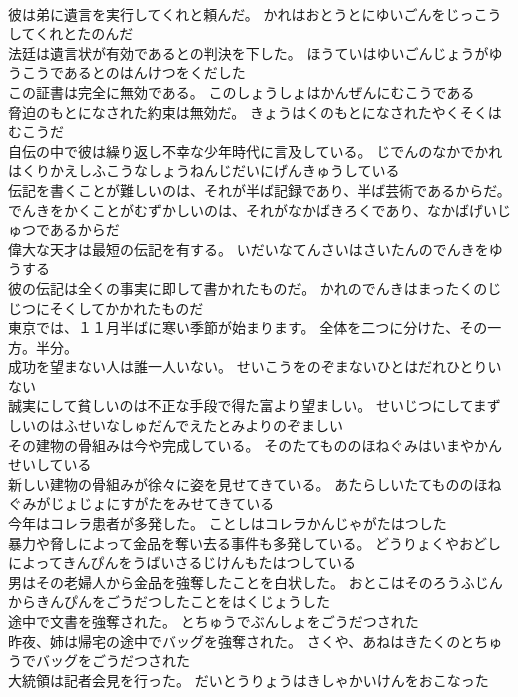 \documentclass[8pt]{extreport}
\begin{document}
\begin{CJK}{UTF8}{min}
\\	彼は弟に遺言を実行してくれと頼んだ。	かれはおとうとにゆいごんをじっこうしてくれとたのんだ 
\\	法廷は遺言状が有効であるとの判決を下した。	ほうていはゆいごんじょうがゆうこうであるとのはんけつをくだした 
\\	この証書は完全に無効である。	このしょうしょはかんぜんにむこうである 
\\	脅迫のもとになされた約束は無効だ。	きょうはくのもとになされたやくそくはむこうだ 
\\	自伝の中で彼は繰り返し不幸な少年時代に言及している。	じでんのなかでかれはくりかえしふこうなしょうねんじだいにげんきゅうしている 
\\	伝記を書くことが難しいのは、それが半ば記録であり、半ば芸術であるからだ。	でんきをかくことがむずかしいのは、それがなかばきろくであり、なかばげいじゅつであるからだ 
\\	偉大な天才は最短の伝記を有する。	いだいなてんさいはさいたんのでんきをゆうする 
\\	彼の伝記は全くの事実に即して書かれたものだ。	かれのでんきはまったくのじじつにそくしてかかれたものだ 
\\	東京では、１１月半ばに寒い季節が始まります。	全体を二つに分けた、その一方。半分。
\\	成功を望まない人は誰一人いない。	せいこうをのぞまないひとはだれひとりいない 
\\	誠実にして貧しいのは不正な手段で得た富より望ましい。	せいじつにしてまずしいのはふせいなしゅだんでえたとみよりのぞましい 
\\	その建物の骨組みは今や完成している。	そのたてもののほねぐみはいまやかんせいしている 
\\	新しい建物の骨組みが徐々に姿を見せてきている。	あたらしいたてもののほねぐみがじょじょにすがたをみせてきている 
\\	今年はコレラ患者が多発した。	ことしはコレラかんじゃがたはつした 
\\	暴力や脅しによって金品を奪い去る事件も多発している。	どうりょくやおどしによってきんぴんをうばいさるじけんもたはつしている 
\\	男はその老婦人から金品を強奪したことを白状した。	おとこはそのろうふじんからきんぴんをごうだつしたことをはくじょうした 
\\	途中で文書を強奪された。	とちゅうでぶんしょをごうだつされた 
\\	昨夜、姉は帰宅の途中でバッグを強奪された。	さくや、あねはきたくのとちゅうでバッグをごうだつされた 
\\	大統領は記者会見を行った。	だいとうりょうはきしゃかいけんをおこなった 

\end{CJK}
\end{document}
